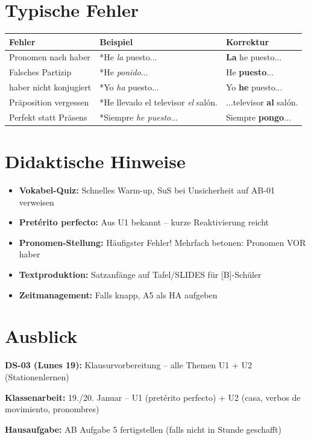 \documentclass[11pt, a4paper]{article}
\begin{document}

\section*{Typische Fehler}

\begin{tabularx}{\textwidth}{@{}lXX@{}}
\textbf{Fehler} & \textbf{Beispiel} & \textbf{Korrektur} \\
\midrule
Pronomen nach haber & *He \textit{la} puesto... & \textbf{La} he puesto... \\
Falsches Partizip & *He \textit{ponido}... & He \textbf{puesto}... \\
haber nicht konjugiert & *Yo \textit{ha} puesto... & Yo \textbf{he} puesto... \\
Präposition vergessen & *He llevado el televisor \textit{el} salón. & ...televisor \textbf{al} salón. \\
Perfekt statt Präsens & *Siempre \textit{he puesto}... & Siempre \textbf{pongo}... \\
\bottomrule
\end{tabularx}


\section*{Didaktische Hinweise}

\begin{itemize}[leftmargin=1.5em]
    \item \textbf{Vokabel-Quiz:} Schnelles Warm-up, SuS bei Unsicherheit auf AB-01 verweisen
    \item \textbf{Pretérito perfecto:} Aus U1 bekannt -- kurze Reaktivierung reicht
    \item \textbf{Pronomen-Stellung:} Häufigster Fehler! Mehrfach betonen: Pronomen VOR haber
    \item \textbf{Textproduktion:} Satzanfänge auf Tafel/SLIDES für [B]-Schüler
    \item \textbf{Zeitmanagement:} Falls knapp, A5 als HA aufgeben
\end{itemize}


\section*{Ausblick}

\textbf{DS-03 (Lunes 19):} Klausurvorbereitung -- alle Themen U1 + U2 (Stationenlernen)

\textbf{Klassenarbeit:} 19./20. Januar -- U1 (pretérito perfecto) + U2 (casa, verbos de movimiento, pronombres)

\textbf{Hausaufgabe:} AB Aufgabe 5 fertigstellen (falls nicht in Stunde geschafft)
\end{document}

